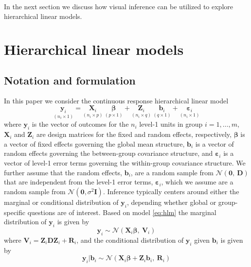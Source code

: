 \documentclass{article} %
\newcommand{\hh}[1]{{\color{orange} #1}}
\begin{document}
In the next section we \hh{discuss} how visual inference can be utilized to explore hierarchical linear models.


\section{Hierarchical linear models}\label{sec:hlms}

\subsection{Notation and formulation}
In this paper we consider the continuous response hierarchical linear model
%
\begin{equation}\label{eq:hlm}
	\underset{(n_i \times 1)}{\bm{y}_i} = \underset{(n_i \times p)}{\bm{X}_i} \ \underset{(p \times 1)}{\bm{\beta}} + \underset{(n_i \times q)}{\bm{Z}_i} \ \underset{(q \times 1)}{\bm{b}_i} + \underset{(n_i \times 1)}{\bm{\varepsilon}_i}
\end{equation}
%
where $\bm{y}_i$ is the vector of outcomes for the $n_i$ level-1 units in group $i=1, \ldots, m$, $\bm{X}_i$ and $\bm{Z}_i$ are design matrices for the fixed and random effects, respectively, $\bm{\beta}$ is a vector of fixed effects governing the global mean structure, $\bm{b}_i$ is a vector of random effects governing the between-group covariance structure, and $\bm{\varepsilon}_i$ is a vector of level-1 error terms governing the within-group covariance structure. We further assume that the random effects, $\bm{b}_i$, are a random sample from $\mathcal{N}(\bm{0},\ \bm{D})$ that are independent from the level-1 error terms, $\bm{\varepsilon}_i$, which we assume are a random sample from $\mathcal{N}(\bm{0},\sigma^2 \bm{I})$. %
Inference typically centers around either the marginal or conditional distribution of $\bm{y}_i$, depending whether global or group-specific questions are of interest.
Based on model \eqref{eq:hlm} the marginal distribution of $\bm{y}_i$ is given by
%
\begin{equation}\label{eq:marginalmod}
\bm{y}_i \sim \mathcal{N}\left(\bm{X}_i\bm{\beta},\ \bm{V}_i \right)
\end{equation}
%
where $\bm{V}_i = \bm{Z}_i \bm{DZ}_i + \bm{R}_i$, and the conditional distribution of $\bm{y}_i$ given $\bm{b}_i$ is given by
%
\begin{equation}\label{eq:conditionalmod}
\bm{y}_i | \bm{b}_i \sim \mathcal{N}\left(\bm{X}_i\bm{\beta} + \bm{Z}_i \bm{b}_i, \ \bm{R}_i \right)
\end{equation}
%
\end{document}

